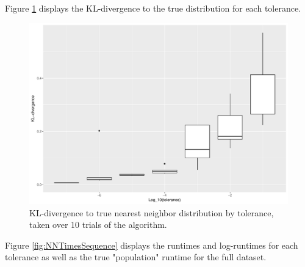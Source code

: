 \documentclass{article}
\begin{document}
Figure \ref{fig:NNDivergencesSequence} displays the KL-divergence to the true distribution for each tolerance.
\begin{figure}
    \includegraphics[width=\linewidth]{Figures/NearestNeighbor/Sequence/div_by_tol.pdf}
    \caption{KL-divergence to true nearest neighbor distribution by tolerance, taken over 10 trials of the algorithm.}
    \label{fig:NNDivergencesSequence}
\end{figure}
Figure \ref{fig:NNTimesSequence} displays the runtimes and log-runtimes for each tolerance as well as the true "population" runtime for the full dataset.
\end{document}
